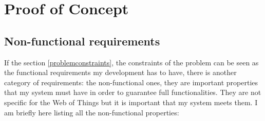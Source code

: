 %
%
\chapter{Proof of Concept}
%
\label{cap:proofofconcept}
%

\section{Non-functional requirements}
If the section \ref{problemconstraints}, the constraints of the problem can be seen as the functional requirements my development has to have, there is another category of requirements: the non-functional ones, they are important properties that my system must have in order to guarantee full functionalities. They are not specific for the Web of Things but it is important that my system meets them.
I am briefly here listing all the non-functional properties:

